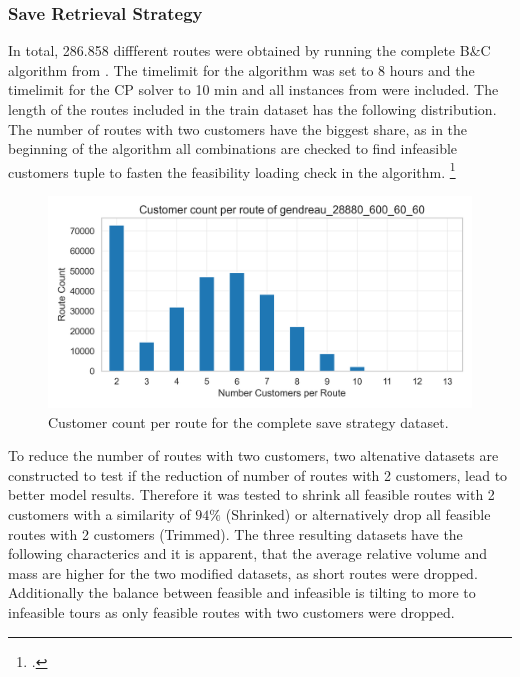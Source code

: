 \subsubsection{Save Retrieval Strategy}

In total, 286.858 diffferent routes were obtained by running the complete B\&C algorithm from \cite{tamke_branch-and-cut_2024}.
The timelimit for the algorithm was set to 8 hours and the timelimit for the \gls{CP} solver to 10 min and all instances from
\gendreauDataSetText were included. The length of the routes included in the
train dataset has the following distribution. The number of routes with two customers have the biggest share,
as in the beginning of the algorithm all combinations are checked to find infeasible customers tuple to
fasten the feasibility loading check in the algorithm. \footcite[cf.][]{tamke_branch-and-cut_2024}

\begin{figure}[ht]
    \centering
    \includegraphics[width = .7\textwidth]{pictures/dataset_structure/no_cust_plot_gendreau_28880_600_60_60.png}
    \caption{Customer count per route for the complete save strategy dataset.}
    \label{fig:customer_count_bc}
\end{figure}
To reduce the number of routes with two customers, two altenative datasets are constructed to test if the reduction
of number of routes with 2 customers, lead to better model results. Therefore it was tested
to shrink all feasible routes with 2 customers with a similarity of $94\%$ (Shrinked) or alternatively drop
all feasible routes with 2 customers (Trimmed).
The three resulting datasets have the following characterics and it is apparent, that the average relative volume
and mass are higher for the two modified datasets, as short routes were dropped. Additionally the balance between
feasible and infeasible is tilting to more to infeasible tours as only feasible routes with two customers were dropped.

